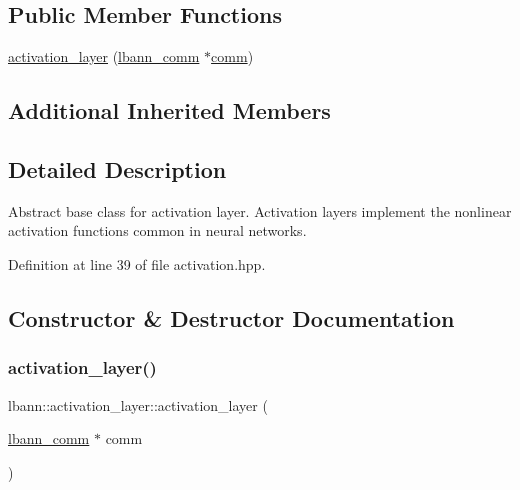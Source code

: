 \subsection*{Public Member Functions}
\begin{DoxyCompactItemize}
\item 
\hyperlink{classlbann_1_1activation__layer_a7df6f5d21ccdd5a24ad6233a52807c6d}{activation\+\_\+layer} (\hyperlink{classlbann_1_1lbann__comm}{lbann\+\_\+comm} $\ast$\hyperlink{file__io_8cpp_ab048c6f9fcbcfaa57ce68b00263dbebe}{comm})
\end{DoxyCompactItemize}
\subsection*{Additional Inherited Members}


\subsection{Detailed Description}
Abstract base class for activation layer. Activation layers implement the nonlinear activation functions common in neural networks. 

Definition at line 39 of file activation.\+hpp.



\subsection{Constructor \& Destructor Documentation}
\mbox{\label{classlbann_1_1activation__layer_a7df6f5d21ccdd5a24ad6233a52807c6d}} 
\subsubsection{\texorpdfstring{activation\+\_\+layer()}{activation\_layer()}}
{\footnotesize\ttfamily lbann\+::activation\+\_\+layer\+::activation\+\_\+layer (\begin{DoxyParamCaption}\item[{\hyperlink{classlbann_1_1lbann__comm}{lbann\+\_\+comm} $\ast$}]{comm }\end{DoxyParamCaption})\hspace{0.3cm}{\ttfamily [inline]}}



